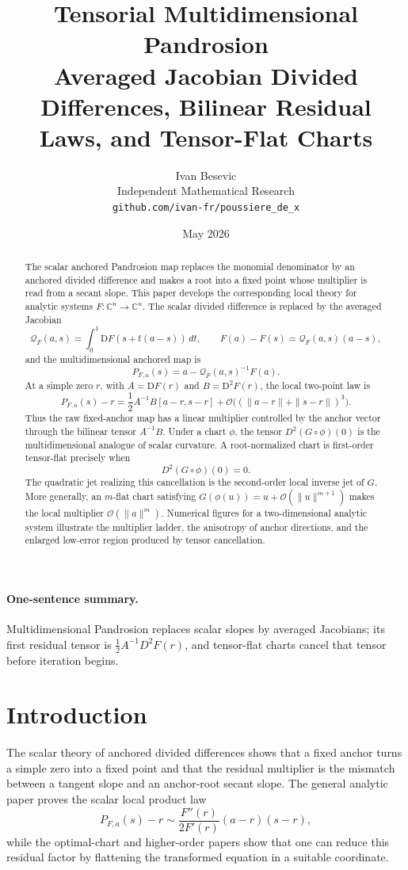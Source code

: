 \documentclass[11pt]{article}
\title{Tensorial Multidimensional Pandrosion\\
\large Averaged Jacobian Divided Differences, Bilinear Residual Laws, and Tensor-Flat Charts}
\author{Ivan Besevic\\Independent Mathematical Research\\\texttt{github.com/ivan-fr/poussiere\_de\_x}}
\date{May 2026}
\theoremstyle{definition}
\newcommand{\C}{\mathbb C}
\newcommand{\D}{\mathrm D}
\newcommand{\Q}{\mathcal Q}
\newcommand{\Oterm}{\mathcal O}
\begin{document}
\maketitle

\begin{abstract}
The scalar anchored Pandrosion map replaces the monomial denominator by an anchored divided difference and makes a root into a fixed point whose multiplier is read from a secant slope. This paper develops the corresponding local theory for analytic systems $F:\C^n\to\C^n$. The scalar divided difference is replaced by the averaged Jacobian
\[
\Q_F(a,s)=\int_0^1 \D F(s+t(a-s))\,dt,
\qquad
F(a)-F(s)=\Q_F(a,s)(a-s),
\]
and the multidimensional anchored map is
\[
P_{F,a}(s)=a-\Q_F(a,s)^{-1}F(a).
\]
At a simple zero $r$, with $A=\D F(r)$ and $B=\D^2F(r)$, the local two-point law is
\[
P_{F,a}(s)-r=\frac12 A^{-1}B[a-r,s-r]+\Oterm\big((\|a-r\|+\|s-r\|)^3\big).
\]
Thus the raw fixed-anchor map has a linear multiplier controlled by the anchor vector through the bilinear tensor $A^{-1}B$. Under a chart $\phi$, the tensor $D^2(G\circ\phi)(0)$ is the multidimensional analogue of scalar curvature. A root-normalized chart is first-order tensor-flat precisely when
\[
D^2(G\circ\phi)(0)=0.
\]
The quadratic jet realizing this cancellation is the second-order local inverse jet of $G$. More generally, an $m$-flat chart satisfying $G(\phi(u))=u+\Oterm(\|u\|^{m+1})$ makes the local multiplier $\Oterm(\|a\|^m)$. Numerical figures for a two-dimensional analytic system illustrate the multiplier ladder, the anisotropy of anchor directions, and the enlarged low-error region produced by tensor cancellation.
\end{abstract}

\paragraph{One-sentence summary.}
Multidimensional Pandrosion replaces scalar slopes by averaged Jacobians; its first residual tensor is $\frac12 A^{-1}D^2F(r)$, and tensor-flat charts cancel that tensor before iteration begins.

\section{Introduction}

The scalar theory of anchored divided differences shows that a fixed anchor turns a simple zero into a fixed point and that the residual multiplier is the mismatch between a tangent slope and an anchor-root secant slope. The general analytic paper proves the scalar local product law
\[
P_{F,a}(s)-r \sim \frac{F''(r)}{2F'(r)}(a-r)(s-r),
\]
while the optimal-chart and higher-order papers show that one can reduce this residual factor by flattening the transformed equation in a suitable coordinate.
\end{document}

